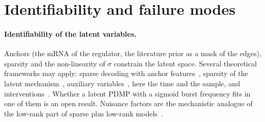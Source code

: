 \documentclass[a4paper, 11pt]{article}
\theoremstyle{plain}
\theoremstyle{remark}
\begin{document}
\section{Identifiability and failure modes}\label{sec:risks}

\paragraph{Identifiability of the latent variables.} Anchors (the mRNA of the regulator, the literature prior as a mask of the edges), sparsity and the non-linearity of $\sigma$ constrain the latent space. Several theoretical frameworks may apply: sparse decoding with anchor features~\cite{moran2022identifiable}, sparsity of the latent mechanism~\cite{lachapelle2022disentanglement}, auxiliary variables~\cite{khemakhem2020variational}, here the time and the sample, and interventions~\cite{zhang2023identifiability}. Whether a latent PDMP with a sigmoid burst frequency fits in one of them is an open result. Nuisance factors are the mechanistic analogue of the low-rank part of sparse plus low-rank models~\cite{chandrasekaran2012latent}.
\end{document}
